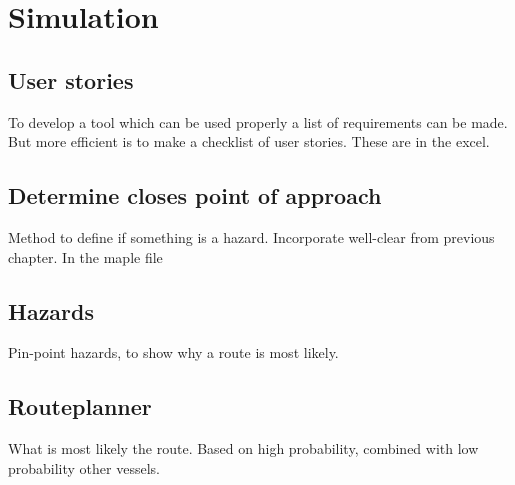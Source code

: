 \chapter{Simulation}

\section{User stories}
To develop a tool which can be used properly a list of requirements can be made. But more efficient is to make a checklist of user stories. These are in the excel.

\section{Determine closes point of approach}
Method to define if something is a hazard. Incorporate well-clear from previous chapter.
In the maple file

\section{Hazards}
Pin-point hazards, to show why a route is most likely.

\section{Routeplanner}
What is most likely the route. Based on high probability, combined with low probability other vessels.
